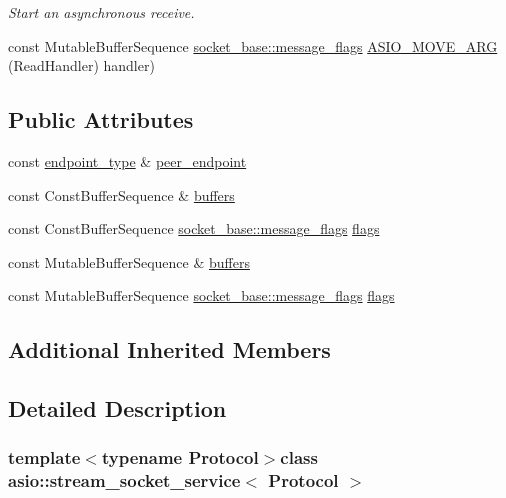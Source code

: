 \begin{DoxyCompactItemize}
\begin{DoxyCompactList}\small\item\em Start an asynchronous receive. \end{DoxyCompactList}\item 
const Mutable\+Buffer\+Sequence \hyperlink{classasio_1_1socket__base_ac3cf77465dfedfe1979b5415cf32cc94}{socket\+\_\+base\+::message\+\_\+flags} \hyperlink{classasio_1_1stream__socket__service_a828ca0556cbaf45eda89f3a0b5278770}{A\+S\+I\+O\+\_\+\+M\+O\+V\+E\+\_\+\+A\+R\+G} (Read\+Handler) handler)
\end{DoxyCompactItemize}
\subsection*{Public Attributes}
\begin{DoxyCompactItemize}
\item 
const \hyperlink{classasio_1_1stream__socket__service_a02567f4db6df303c08c6dadc09e76273}{endpoint\+\_\+type} \& \hyperlink{classasio_1_1stream__socket__service_a10482eb90896463e21694b8fc352ff96}{peer\+\_\+endpoint}
\item 
const Const\+Buffer\+Sequence \& \hyperlink{classasio_1_1stream__socket__service_a2b418591be64237dabe9260a184d2a2a}{buffers}
\item 
const Const\+Buffer\+Sequence \hyperlink{classasio_1_1socket__base_ac3cf77465dfedfe1979b5415cf32cc94}{socket\+\_\+base\+::message\+\_\+flags} \hyperlink{classasio_1_1stream__socket__service_ab3077e35cb3e3ff867fb8c45233f7d69}{flags}
\item 
const Mutable\+Buffer\+Sequence \& \hyperlink{classasio_1_1stream__socket__service_ac2c573da311f37dca37d770fad21003b}{buffers}
\item 
const Mutable\+Buffer\+Sequence \hyperlink{classasio_1_1socket__base_ac3cf77465dfedfe1979b5415cf32cc94}{socket\+\_\+base\+::message\+\_\+flags} \hyperlink{classasio_1_1stream__socket__service_a0531bf38d8ac2bda7cd35e92827b2e8c}{flags}
\end{DoxyCompactItemize}
\subsection*{Additional Inherited Members}


\subsection{Detailed Description}
\subsubsection*{template$<$typename Protocol$>$class asio\+::stream\+\_\+socket\+\_\+service$<$ Protocol $>$}

